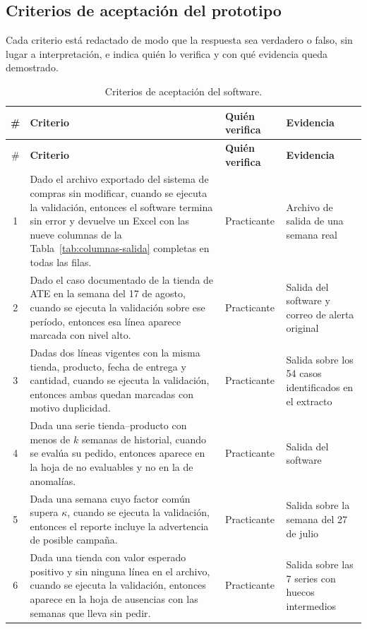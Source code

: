 \fi
\subsection{Criterios de aceptación del prototipo}

Cada criterio está redactado de modo que la respuesta sea verdadero o falso, sin lugar a interpretación, e indica quién lo verifica y con qué evidencia queda demostrado.

\begin{longtable}{@{}c p{8.6cm} L{2cm} L{3.2cm}@{}}
\caption{Criterios de aceptación del software.}\label{tab:aceptacion}\\
\toprule
\# & \textbf{Criterio} & \textbf{Quién verifica} & \textbf{Evidencia} \\
\midrule
\endfirsthead
\toprule
\# & \textbf{Criterio} & \textbf{Quién verifica} & \textbf{Evidencia} \\
\midrule
\endhead
\small 1 & \small Dado el archivo exportado del sistema de compras sin modificar, cuando se ejecuta la validación, entonces el software termina sin error y devuelve un Excel con las nueve columnas de la Tabla~\ref{tab:columnas-salida} completas en todas las filas. & \small Practicante & \small Archivo de salida de una semana real \\
\small 2 & \small Dado el caso documentado de la tienda de ATE en la semana del 17 de agosto, cuando se ejecuta la validación sobre ese período, entonces esa línea aparece marcada con nivel alto. & \small Practicante & \small Salida del software y correo de alerta original \\
\small 3 & \small Dadas dos líneas vigentes con la misma tienda, producto, fecha de entrega y cantidad, cuando se ejecuta la validación, entonces ambas quedan marcadas con motivo duplicidad. & \small Practicante & \small Salida sobre los 54 casos identificados en el extracto \\
\small 4 & \small Dada una serie tienda--producto con menos de $k$ semanas de historial, cuando se evalúa su pedido, entonces aparece en la hoja de no evaluables y no en la de anomalías. & \small Practicante & \small Salida del software \\
\small 5 & \small Dada una semana cuyo factor común supera $\kappa$, cuando se ejecuta la validación, entonces el reporte incluye la advertencia de posible campaña. & \small Practicante & \small Salida sobre la semana del 27 de julio \\
\small 6 & \small Dada una tienda con valor esperado positivo y sin ninguna línea en el archivo, cuando se ejecuta la validación, entonces aparece en la hoja de ausencias con las semanas que lleva sin pedir. & \small Practicante & \small Salida sobre las 7 series con huecos intermedios \\

\end{longtable}
